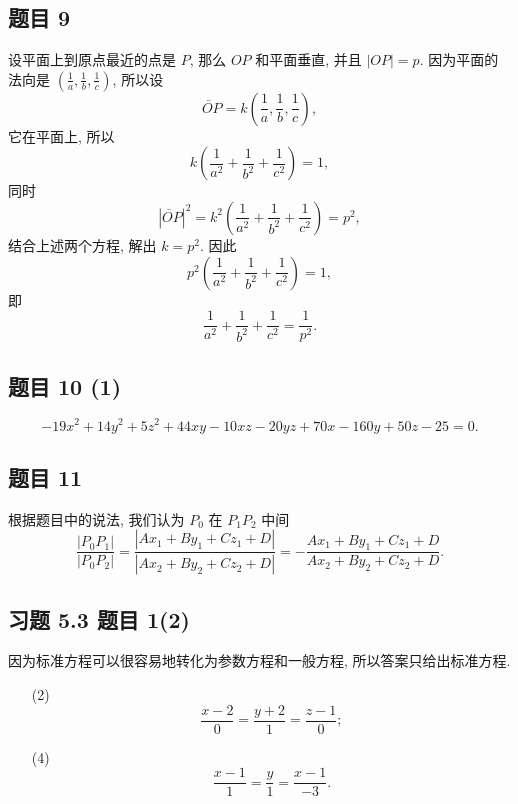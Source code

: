 \subsection*{ 题目 9 }
\begin{solution}
设平面上到原点最近的点是 $P$, 那么 $OP$ 和平面垂直, 并且 $|OP| = p$. 因为平面的法向是 $(\frac{1}{a}, \frac{1}{b}, \frac{1}{c})$, 所以设 
\[
    \lvec{OP} = k(\frac{1}{a}, \frac{1}{b}, \frac{1}{c}),
\]
它在平面上, 所以
\[
    k(\frac{1}{a^2} + \frac{1}{b^2} + \frac{1}{c^2}) = 1,
\]
同时
\[
    |\lvec{OP}|^2 = k^2(\frac{1}{a^2} + \frac{1}{b^2} + \frac{1}{c^2}) = p^2,
\]
结合上述两个方程, 解出 $k = p^2$. 因此
\[
    p^2(\frac{1}{a^2} + \frac{1}{b^2} + \frac{1}{c^2}) = 1,
\]
即
\[
    \frac{1}{a^2} + \frac{1}{b^2} + \frac{1}{c^2} = \frac{1}{p^2}.
\]
\end{solution}

\subsection*{ 题目 10 (1) }
\begin{solution}
\[
-19x^2 + 14y^2 + 5z^2 + 44xy - 10xz - 20yz + 70x - 160y + 50z - 25 = 0.
\]
\end{solution}

\subsection*{ 题目 11 }
\begin{solution}
    根据题目中的说法, 我们认为 $P_0$ 在 $P_1P_2$ 中间
\[
\frac{|P_0P_1|}{|P_0P_2|} = \frac{|Ax_1 + By_1 + Cz_1 + D|}{|Ax_2 + By_2 + Cz_2 + D|} = -\frac{Ax_1 + By_1 + Cz_1 + D}{Ax_2 + By_2 + Cz_2 + D}.
\]
\end{solution}

\subsection*{ 习题 5.3 题目 1(2) }
\begin{solution}
    因为标准方程可以很容易地转化为参数方程和一般方程, 所以答案只给出标准方程.
\begin{enumerate}
    \item[(2)]
    \[
        \frac{x - 2}{0} = \frac{y + 2}{1} = \frac{z - 1}{0};
    \]
    \item[(4)]
    \[
        \frac{x - 1}{1} = \frac{y}{1} = \frac{x - 1}{-3}.
    \]
\end{enumerate}
\end{solution}


